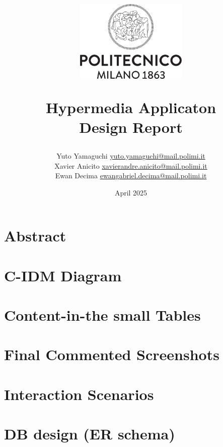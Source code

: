 \documentclass{article}
\title{
        \vspace{-2cm}
        \begin{center}
                \includegraphics[width=0.4\textwidth]{asset/Logo_Politecnico_Milano.png} %
        \end{center}
        \vspace{1cm}
        \textbf{Hypermedia Applicaton \\ Design Report}
}
\author{Yuto Yamaguchi \href{mailto:yuto.yamaguchi@mail.polimi.it}{yuto.yamaguchi@mail.polimi.it} \\
Xavier Anicito \href{mailto:xavierandre.anicito@mail.polimi.it}{xavierandre.anicito@mail.polimi.it} \\
Ewan Decima \href{mailto:ewangabriel.decima@mail.polimi.it}{ewangabriel.decima@mail.polimi.it}
}
\date{April 2025}
\begin{document}
\maketitle
\tableofcontents
\newpage

\section{Abstract}

\section{C-IDM Diagram}

\section{Content-in-the small Tables}

\section{Final Commented Screenshots}

\section{Interaction Scenarios}

\section{DB design (ER schema)}
\end{document}
